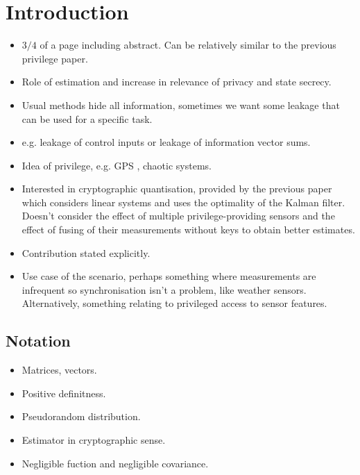 \documentclass[conference]{IEEEtran}
\begin{document}
\section{Introduction}
\begin{itemize}
  \item $3/4$ of a page including abstract. Can be relatively similar to the previous privilege paper.
  \item Role of estimation and increase in relevance of privacy and state secrecy.
  \item Usual methods hide all information, sometimes we want some leakage that can be used for a specific task.
  \item e.g. leakage of control inputs or leakage of information vector sums.
  \item Idea of privilege, e.g. GPS \cite{grovesPrinciplesGNSSInertial2015}, chaotic systems.
  \item Interested in cryptographic quantisation, provided by the previous paper which considers linear systems and uses the optimality of the Kalman filter. Doesn't consider the effect of multiple privilege-providing sensors and the effect of fusing of their measurements without keys to obtain better estimates. 
  \item Contribution stated explicitly.
  \item Use case of the scenario, perhaps something where measurements are infrequent so synchronisation isn't a problem, like weather sensors. Alternatively, something relating to privileged access to sensor features.
\end{itemize}

\subsection{Notation}
\begin{itemize}
  \item Matrices, vectors.
  \item Positive definitness.
  \item Pseudorandom distribution.
  \item Estimator in cryptographic sense.
  \item Negligible fuction and negligible covariance.
\end{itemize}

% 
%                                              
%                                              
%                                              
% 
\end{document}
